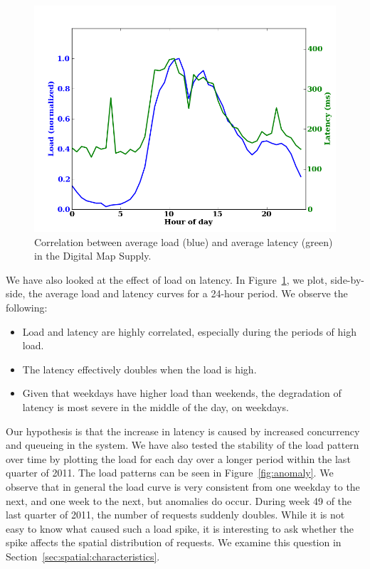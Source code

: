 \documentclass[11pt, oneside]{report}
\begin{document}
{\begin{figure}
\centering
\includegraphics[scale=0.5]{figs-tileheat/correlation.png}
\caption{Correlation between average load (blue) and average latency (green) in the Digital Map Supply.}
\label{fig:correlation}
\end{figure}

We have also looked at the effect of load on latency. In Figure~\ref{fig:correlation}, we plot, side-by-side, the average load and latency curves for a 24-hour period. We observe the following:

\begin{itemize}
\item Load and latency are highly correlated, especially during the periods of high load.
\item The latency effectively doubles when the load is high.
\item Given that weekdays have higher load than weekends, the degradation of latency is most severe in the middle of the day, on weekdays.
\end{itemize}

Our hypothesis is that the increase in latency is caused by increased concurrency and queueing in the system. We have also tested the stability of the load pattern over time by plotting the load for each day over a longer period within the last quarter of 2011. The load patterns can be seen in Figure~\ref{fig:anomaly}. We observe that in general the load curve is very consistent from one weekday to the next, and one week to the next, but anomalies do occur. During week 49 of the last quarter of 2011, the number of requests suddenly doubles. While it is not easy to know what caused such a load spike, it is interesting to ask whether the spike affects the spatial distribution of requests. We examine this question in Section~\ref{sec:spatial:characteristics}.

}
\end{document}
